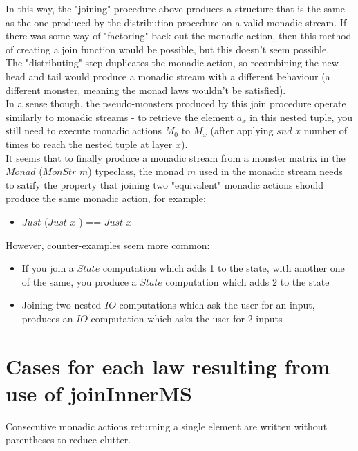 \documentclass{article}
\begin{document}
In this way, the "joining" procedure above produces a structure that is the same as the one produced by the distribution procedure on a valid monadic stream. If there was some way of "factoring" back out the monadic action, then this method of creating a join function would be possible, but this doesn't seem possible.\\ 

The "distributing" step duplicates the monadic action, so recombining the new head and tail would produce a monadic stream with a different behaviour (a different monster, meaning the monad laws wouldn't be satisfied).\\

In a sense though, the pseudo-monsters produced by this join procedure operate similarly to monadic streams - to retrieve the element $a_x$ in this nested tuple, you still need to execute monadic actions $M_0$ to $M_x$ (after applying $snd$ $x$ number of times to reach the nested tuple at layer $x$).\\

It seems that to finally produce a monadic stream from a monster matrix in the $Monad$ ($MonStr$ $m$) typeclass, the monad $ m $ used in the monadic stream needs to satify the property that joining two "equivalent" monadic actions should produce the same monadic action, for example:
\begin{itemize}
	\item $ Just $ ($ Just $ $ x $ ) == $ Just $ $ x $
\end{itemize}
However, counter-examples seem more common:
\begin{itemize}
	\item If you join a $ State $ computation which adds 1 to the state, with another one of the same, you produce a $ State $ computation which adds 2 to the state
	\item Joining two nested $ IO $ computations which ask the user for an input, produces an $ IO $ computation which asks the user for 2 inputs
\end{itemize}

\section{Cases for each law resulting from use of joinInnerMS}

Consecutive monadic actions returning a single element are written without parentheses to reduce clutter.\\
\end{document}

